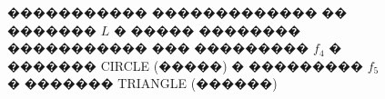 \documentclass[a4paper]{article}
\begin{document}
\begin{figure}[!h]
\begin{minipage}[h]{0.49\linewidth}
  \end{minipage}
  \caption{����������� ������������� �� ������� $L$ � ����� �������� ����������� ��� ��������� $f_4$ � ������� CIRCLE (�����) �  ��������� $f_5$ � ������� TRIANGLE (������)}
  \label{r1}
\end{figure}
\end{document}
